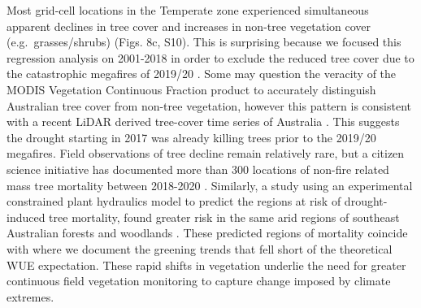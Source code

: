 \documentclass[gc, manuscript]{copernicus}
\begin{document}
Most grid-cell locations in the Temperate zone experienced simultaneous
apparent declines in tree cover and increases in non-tree vegetation
cover (e.g.~grasses/shrubs) (Figs. 8c, S10). This is surprising because
we focused this regression analysis on 2001-2018 in order to exclude the
reduced tree cover due to the catastrophic megafires of 2019/20
\citep{nolanCausesConsequencesEastern2020}. Some may question the
veracity of the MODIS Vegetation Continuous Fraction product
\citep{dimiceliMOD44BMODISTerra2017} to accurately distinguish
Australian tree cover from non-tree vegetation, however this pattern is
consistent with a recent LiDAR derived tree-cover time series of
Australia \citep{liaoWoodyVegetationCover2020}. This suggests the
drought starting in 2017 was already killing trees prior to the 2019/20
megafires. Field observations of tree decline remain relatively rare,
but a citizen science initiative has documented more than 300 locations
of non-fire related mass tree mortality between 2018-2020
\citep{atlasoflivingaustraliaDeadTreeDetective}. Similarly, a study
using an experimental constrained plant hydraulics model to predict the
regions at risk of drought-induced tree mortality, found greater risk in
the same arid regions of southeast Australian forests and woodlands
\citep{dekauweIdentifyingAreasRisk2020b}. These predicted regions of
mortality coincide with where we document the greening trends that fell
short of the theoretical WUE expectation. These rapid shifts in
vegetation underlie the need for greater continuous field vegetation
monitoring to capture change imposed by climate extremes.
\end{document}
